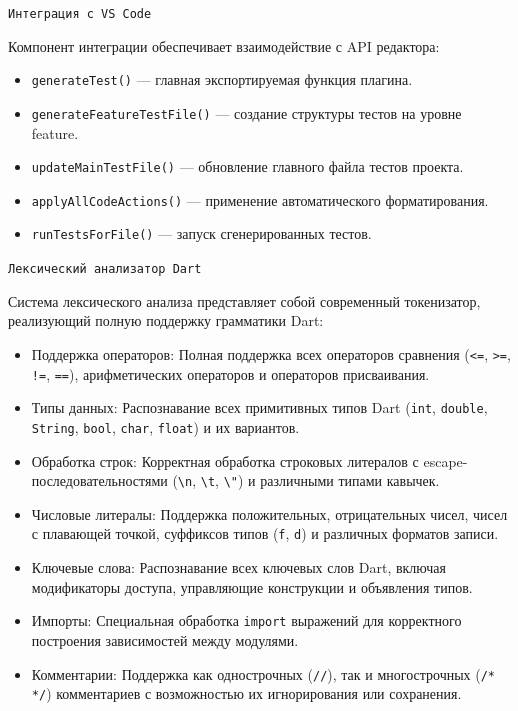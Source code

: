 \documentclass[14pt, russian]{scrartcl}
\begin{document}
\texttt{Интеграция с VS Code}

Компонент интеграции обеспечивает взаимодействие с API редактора:

\begin{itemize}
    \item \texttt{generateTest()} — главная экспортируемая функция плагина.
    \item \texttt{generateFeatureTestFile()} — создание структуры тестов на уровне feature.
    \item \texttt{updateMainTestFile()} — обновление главного файла тестов проекта.
    \item \texttt{applyAllCodeActions()} — применение автоматического форматирования.
    \item \texttt{runTestsForFile()} — запуск сгенерированных тестов.
\end{itemize}

\texttt{Лексический анализатор Dart}

Система лексического анализа представляет собой современный токенизатор, реализующий полную поддержку грамматики Dart:

\begin{itemize}
    \item Поддержка операторов: Полная поддержка всех операторов сравнения (\texttt{<=}, \texttt{>=}, \texttt{!=}, \texttt{==}), арифметических операторов и операторов присваивания.
    \item Типы данных: Распознавание всех примитивных типов Dart (\texttt{int}, \texttt{double}, \texttt{String}, \texttt{bool}, \texttt{char}, \texttt{float}) и их вариантов.
    \item Обработка строк: Корректная обработка строковых литералов с escape-последовательностями (\texttt{\textbackslash n}, \texttt{\textbackslash t}, \texttt{\textbackslash"}) и различными типами кавычек.
    \item Числовые литералы: Поддержка положительных, отрицательных чисел, чисел с плавающей точкой, суффиксов типов (\texttt{f}, \texttt{d}) и различных форматов записи.
    \item Ключевые слова: Распознавание всех ключевых слов Dart, включая модификаторы доступа, управляющие конструкции и объявления типов.
    \item Импорты: Специальная обработка \texttt{import} выражений для корректного построения зависимостей между модулями.
    \item Комментарии: Поддержка как однострочных (\texttt{//}), так и многострочных (\texttt{/* */}) комментариев с возможностью их игнорирования или сохранения.
\end{itemize}
\end{document}
